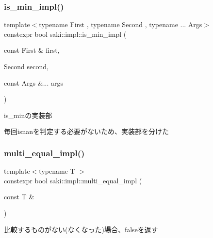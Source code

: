 \subsubsection{\texorpdfstring{is\+\_\+min\+\_\+impl()}{is\_min\_impl()}\hspace{0.1cm}{\footnotesize\ttfamily [2/2]}}
{\footnotesize\ttfamily template$<$typename First , typename Second , typename ... Args$>$ \\
constexpr bool saki\+::impl\+::is\+\_\+min\+\_\+impl (\begin{DoxyParamCaption}\item[{const First \&}]{first,  }\item[{Second}]{second,  }\item[{const Args \&...}]{args }\end{DoxyParamCaption})}



is\+\_\+minの実装部 

毎回isnanを判定する必要がないため、実装部を分けた \mbox{\label{namespacesaki_1_1impl_ac271639854025a923addee4879780f96}} 
\subsubsection{\texorpdfstring{multi\+\_\+equal\+\_\+impl()}{multi\_equal\_impl()}\hspace{0.1cm}{\footnotesize\ttfamily [1/2]}}
{\footnotesize\ttfamily template$<$typename T $>$ \\
constexpr bool saki\+::impl\+::multi\+\_\+equal\+\_\+impl (\begin{DoxyParamCaption}\item[{const T \&}]{ }\end{DoxyParamCaption})}



比較するものがない(なくなった)場合、falseを返す 

\mbox{\label{namespacesaki_1_1impl_a45c9f8730634f6b621bca7d8dc73e43d}} 
